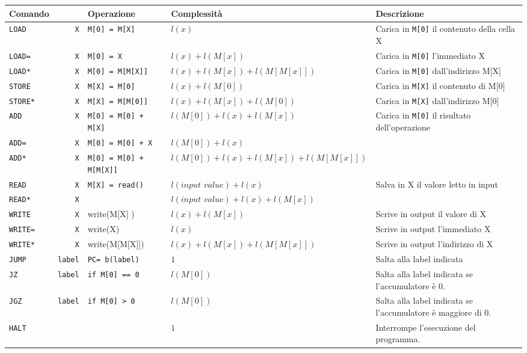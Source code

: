 \documentclass[10pt,a4paper]{article}
\newcommand{\code}{\texttt}
\begin{document}
\begin{tabularx}{\linewidth}{l r|l|l|X}
    \hline
    Comando && Operazione & Complessit\`a & Descrizione\\
    \hline
    \code{LOAD} &\code{X}& \code{M[0] = M[X]} & $l(x)$ & Carica in \code{M[0]} il contenuto della cella X\\
    \code{LOAD=} &\code{X}& \code{M[0] = X} & $l(x) + l(M[x])$ & Carica in \code{M[0]} l'immediato X\\
    \code{LOAD*} &\code{X}& \code{M[0] = M[M[X]]} & $l(x) + l(M[x]) + l(M[M[x]])$ & Carica in \code{M[0]} dall'indirizzo M[X]\\
    \code{STORE} &\code{X}& \code{M[X] = M[0]} & $l(x) + l(M[0])$ & Carica in \code{M[X]} il contenuto di M[0]\\
    \code{STORE*} &\code{X}& \code{M[X] = M[M[0]]} & $l(x) + l(M[x]) + l(M[0])$& Carica in \code{M[X]} dall'indirizzo M[0]\\
    \code{ADD} &\code{X}& \code{M[0] = M[0] + M[X]} & $l(M[0]) + l(x) + l(M[x])$ & Carica in \code{M[0]} il risultato dell'operazione\\
    \code{ADD=} &\code{X}& \code{M[0] = M[0] + X} & $l(M[0]) + l(x)$ &\\
    \code{ADD*} &\code{X}& \code{M[0] = M[0] + M[M[X]]} & $l(M[0]) + l(x) + l(M[x]) + l(M[M[x]])$ &\\

    \code{READ} &\code{X}& \code{M[X] = read()} & $l(\textit{input value}) + l(x)$& Salva in X il valore letto in input\\
    \code{READ*} &\code{X}& & $l(\textit{input value}) + l(x) + l(M[x])$ & \\
    \code{WRITE} &\code{X}& write(M[X] ) & $l(x) + l(M[x])$ & Scrive in output il valore di X\\
    \code{WRITE=} &\code{X}& write(X) & $l(x)$ & Scrive in output l'immediato X\\
    \code{WRITE*} &\code{X}& write(M[M[X]]) & $l(x) + l(M[x]) + l(M[M[x]])$ & Scrive in output l'indirizzo di X\\
    \code{JUMP} &\code{label}& \code{PC= b(label)} & $1$ & Salta alla label indicata\\
    \code{JZ} &\code{label}& \code{if M[0] == 0}& $l(M[0])$& Salta alla label indicata se l'accumulatore \`e $0$.\\
    \code{JGZ} &\code{label}& \code{if M[0] > 0}& $l(M[0])$& Salta alla label indicata se l'accumulatore \`e maggiore di $0$.\\
    \code{HALT} && & $1$& Interrompe l'esecuzione del programma.\\
\end{tabularx}
\end{document}
